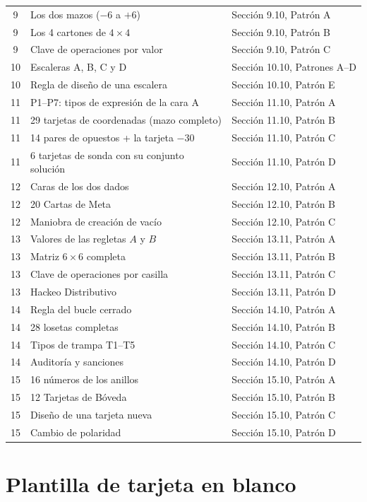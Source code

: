 \documentclass[12pt, letterpaper]{article}
\begin{document}
\begin{longtable}{@{}c l l@{}}
9 & Los dos mazos ($-6$ a $+6$) & Sección 9.10, Patrón A\\
9 & Los 4 cartones de $4\times 4$ & Sección 9.10, Patrón B\\
9 & Clave de operaciones por valor & Sección 9.10, Patrón C\\
10 & Escaleras A, B, C y D & Sección 10.10, Patrones A--D\\
10 & Regla de diseño de una escalera & Sección 10.10, Patrón E\\
11 & P1--P7: tipos de expresión de la cara A & Sección 11.10, Patrón A\\
11 & 29 tarjetas de coordenadas (mazo completo) & Sección 11.10, Patrón B\\
11 & 14 pares de opuestos + la tarjeta $-30$ & Sección 11.10, Patrón C\\
11 & 6 tarjetas de sonda con su conjunto solución & Sección 11.10, Patrón D\\
12 & Caras de los dos dados & Sección 12.10, Patrón A\\
12 & 20 Cartas de Meta & Sección 12.10, Patrón B\\
12 & Maniobra de creación de vacío & Sección 12.10, Patrón C\\
13 & Valores de las regletas $A$ y $B$ & Sección 13.11, Patrón A\\
13 & Matriz $6\times 6$ completa & Sección 13.11, Patrón B\\
13 & Clave de operaciones por casilla & Sección 13.11, Patrón C\\
13 & Hackeo Distributivo & Sección 13.11, Patrón D\\
14 & Regla del bucle cerrado & Sección 14.10, Patrón A\\
14 & 28 losetas completas & Sección 14.10, Patrón B\\
14 & Tipos de trampa T1--T5 & Sección 14.10, Patrón C\\
14 & Auditoría y sanciones & Sección 14.10, Patrón D\\
15 & 16 números de los anillos & Sección 15.10, Patrón A\\
15 & 12 Tarjetas de Bóveda & Sección 15.10, Patrón B\\
15 & Diseño de una tarjeta nueva & Sección 15.10, Patrón C\\
15 & Cambio de polaridad & Sección 15.10, Patrón D\\
\end{longtable}

\section{Plantilla de tarjeta en blanco}
\end{document}
